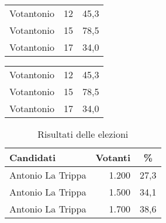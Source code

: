 \documentclass[a4paper,10pt]{article}
\begin{document}


\begin{tabular}{l r r}
Votantonio	&	12 &	45,3 \\
Votantonio	&	15 &	78,5 \\
Votantonio	&	17 & 	34,0 \\
\end{tabular}




 \begin{table}[htb] %
 \begin{tabular}{l r r}
 Votantonio	&	12 &	45,3 \\
 Votantonio	&	15 &	78,5 \\
 Votantonio	&	17 & 	34,0 \\
 \end{tabular}
 \end{table}





 \begin{table}[htb] \caption{Risultati delle elezioni}
   \centering
 	\begin{tabular}{p{} r r}\hline
 		\multicolumn{1}{l}{Candidati}
 		&\multicolumn{1}{c}{Votanti}
 		&\multicolumn{1}{c}{\%}\\\hline
 		Antonio La Trippa	&	1.200 &	27,3 \\
 		Antonio La Trippa	&	1.500 &	34,1 \\
 		Antonio La Trippa	&	1.700 & 38,6 \\\hline
 	\end{tabular}
 \end{table}
\end{document}
